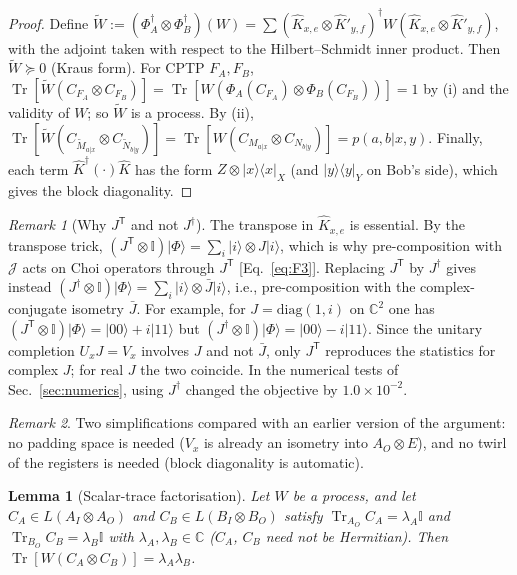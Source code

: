 \documentclass[aps,pra,onecolumn,notitlepage,superscriptaddress,longbibliography,nofootinbib,11pt]{revtex4-2}
\newtheorem{lemma}{Lemma}
\theoremstyle{remark}
\newtheorem{remark}{Remark}
\newcommand{\Tr}{\operatorname{Tr}}
\newcommand{\ket}[1]{\lvert #1\rangle}
\newcommand{\bra}[1]{\langle #1\rvert}
\newcommand{\one}{\mathbb{I}}
\newcommand{\tp}{\mathsf{T}}
\newcommand{\CC}{\mathbb{C}}
\begin{document}
\begin{proof}
Define $\widetilde W:=(\Phi_A^\dagger\otimes\Phi_B^\dagger)(W)=\sum(\hat K_{x,e}\otimes\hat K'_{y,f})^\dagger W(\hat K_{x,e}\otimes\hat K'_{y,f})$, with the adjoint taken with respect to the Hilbert--Schmidt inner product. Then $\widetilde W\succeq0$ (Kraus form). For CPTP $F_A,F_B$, $\Tr[\widetilde W(C_{F_A}\otimes C_{F_B})]=\Tr[W(\Phi_A(C_{F_A})\otimes\Phi_B(C_{F_B}))]=1$ by (i) and the validity of $W$; so $\widetilde W$ is a process. By (ii), $\Tr[\widetilde W(C_{\widetilde M_{a|x}}\otimes C_{\widetilde N_{b|y}})]=\Tr[W(C_{M_{a|x}}\otimes C_{N_{b|y}})]=p(a,b|x,y)$. Finally, each term $\hat K^\dagger(\cdot)\hat K$ has the form $Z\otimes\ket{x}\bra{x}_X$ (and $\ket{y}\bra{y}_Y$ on Bob's side), which gives the block diagonality.
\end{proof}

\begin{remark}[Why $J^\tp$ and not $J^\dagger$]\label{rem:transpose}
The transpose in $\hat K_{x,e}$ is essential. By the transpose trick, $(J^\tp\otimes\one)\ket{\Phi}=\sum_i\ket{i}\otimes J\ket{i}$, which is why pre-composition with $\mathcal J$ acts on Choi operators through $J^\tp$ [Eq.~\eqref{eq:F3}]. Replacing $J^\tp$ by $J^\dagger$ gives instead $(J^\dagger\otimes\one)\ket{\Phi}=\sum_i\ket{i}\otimes\bar J\ket{i}$, i.e., pre-composition with the complex-conjugate isometry $\bar J$. For example, for $J=\mathrm{diag}(1,i)$ on $\CC^2$ one has $(J^\tp\otimes\one)\ket{\Phi}=\ket{00}+i\ket{11}$ but $(J^\dagger\otimes\one)\ket{\Phi}=\ket{00}-i\ket{11}$. Since the unitary completion $U_xJ=V_x$ involves $J$ and not $\bar J$, only $J^\tp$ reproduces the statistics for complex $J$; for real $J$ the two coincide. In the numerical tests of Sec.~\ref{sec:numerics}, using $J^\dagger$ changed the objective by $1.0\times10^{-2}$.
\end{remark}

\begin{remark}
Two simplifications compared with an earlier version of the argument: no padding space is needed ($V_x$ is already an isometry into $A_O\otimes E$), and no twirl of the registers is needed (block diagonality is automatic).
\end{remark}

\begin{lemma}[Scalar-trace factorisation]\label{lem:S-v2}
Let $W$ be a process, and let $C_A\in L(A_I\otimes A_O)$ and $C_B\in L(B_I\otimes B_O)$ satisfy $\Tr_{A_O}C_A=\lambda_A\one$ and $\Tr_{B_O}C_B=\lambda_B\one$ with $\lambda_A,\lambda_B\in\CC$ ($C_A$, $C_B$ need not be Hermitian). Then $\Tr[W(C_A\otimes C_B)]=\lambda_A\lambda_B$.
\end{lemma}
\end{document}
